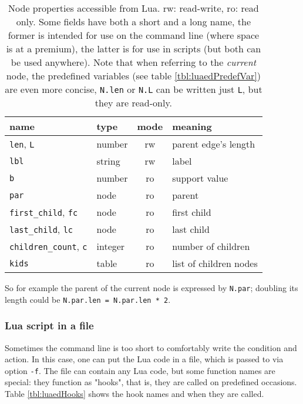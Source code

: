 \begin{table}
	\center
	\begin{tabular}{llcl}
		name & type & mode & meaning \\
		\hline
		\texttt{len}, \texttt{L} 	& number 	& rw & parent edge's length \\
		\texttt{lbl}							& string 	& rw & label \\
		\texttt{b}								& number	& ro & support value \\
		\texttt{par}							& node		& ro & parent \\
		\texttt{first\_child}, \texttt{fc}  & node & ro & first child \\
		\texttt{last\_child}, \texttt{lc} 	& node & ro & last child \\
		\texttt{children\_count}, \texttt{c} 	& integer & ro & number of children \\
		\texttt{kids}							& table		& ro & list of children nodes
	\end{tabular}
	\caption{%
		\label{tbl:luaedNodeProp}
		Node properties accessible from Lua. rw: read-write, ro: read only. Some
		fields have both a short and a long name, the former is intended for use on
		the command line (where space is at a premium), the latter is for use in
		scripts (but both can be used anywhere). Note that when referring to the
		\emph{current} node, the predefined variables (see table
		\ref{tbl:luaedPredefVar}) are even more concise, \eg{} \texttt{N.len} or
		\texttt{N.L} can be written just \texttt{L}, but they are read-only.
	}
\end{table}

\noindent{}So for example the parent of the current node is expressed by
\texttt{N.par}; doubling its length could be \texttt{N.par.len = N.par.len * 2}.

\subsubsection{Lua script in a file}
\label{sct:lua_file_input}

Sometimes the command line is too short to comfortably write the condition and
action. In this case, one can put the Lua code in a file, which is passed to
\luaed{} via option \texttt{-f}. The file can contain any Lua code, but some
function names are special: they function as "hooks", that is, they are called
on predefined occasions. Table \ref{tbl:luaedHooks} shows the hook names and
when they are called.

